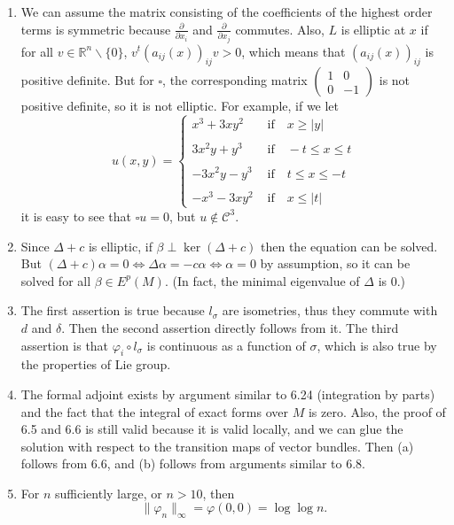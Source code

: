 \begin{enumerate}
\item We can assume the matrix consisting of the coefficients of the highest order terms is symmetric 
because $\frac{\partial}{\partial x_{i}}$ and $\frac{\partial}{\partial x_{j}}$ commutes. 
Also, $L$ is elliptic at $x$ if for all $v \in \mathbb{R}^{n} \backslash\{0\}$, $v^{t}(a_{ij}(x))_{ij}v>0$, which means that $(a_{ij}(x))_{ij}$ is positive definite. 
But for $\square$, the corresponding matrix $\begin{pmatrix}1 & 0 \\ 0 & -1\end{pmatrix}$ is not positive definite, so it is not elliptic. For example, if we let
$$u(x, y)=\begin{cases}
x^{3}+3xy^{2} & \text { if }\ \ \ x \geq|y| \\ \\
3x^{2}y+y^{3} & \text { if }\ \ \ -t \leq x \leq t \\ \\
-3x^{2}y-y^{3} & \text { if }\ \ \ t \leq x \leq -t \\ \\
-x^{3}-3xy^{2} & \text { if }\ \ \ x \leq |t|
\end{cases}$$
it is easy to see that $\square u=0$, but $u \notin \mathcal{C}^{3}$.
\item Since $\Delta+c$ is elliptic, if $\beta \perp \ker(\Delta+c)$ then the equation can be solved. 
But $(\Delta+c) \alpha=0 \Leftrightarrow \Delta \alpha=-c \alpha \Leftrightarrow \alpha=0$ by assumption, so it can be solved for all $\beta \in E^{p}(M)$. (In fact, the minimal eigenvalue of $\Delta$ is $0$.)
\item The first assertion is true because $l_{\sigma}$ are isometries, thus they commute with $d$ and $\delta$. 
Then the second assertion directly follows from it. 
The third assertion is that $\varphi_{i} \circ l_{\sigma}$ is continuous as a function of $\sigma$, which is also true by the properties of Lie group.
\item The formal adjoint exists by argument similar to 6.24 (integration by parts) 
and the fact that the integral of exact forms over $M$ is zero. 
Also, the proof of 6.5 and 6.6 is still valid because it is valid locally, 
and we can glue the solution with respect to the transition maps of vector bundles. 
Then (a) follows from 6.6, and (b) follows from arguments similar to 6.8.
\item For $n$ sufficiently large, or $n>10$, then
\[\|\varphi_{n}\|_{\infty}=\varphi(0,0)=\log \log n.\]

\end{enumerate}

